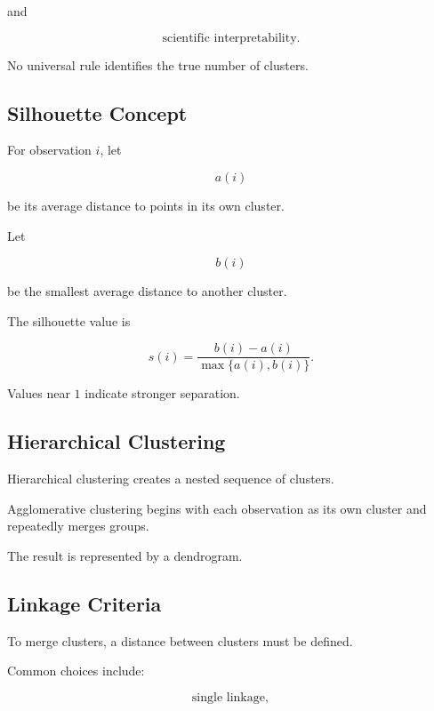 and

\[
\boxed{
\text{scientific interpretability}.
}
\]

No universal rule identifies the true number of clusters.

\subsection{Silhouette Concept}
\label{subsec:silhouette}

For observation \(i\), let

\[
a(i)
\]

be its average distance to points in its own cluster.

Let

\[
b(i)
\]

be the smallest average distance to another cluster.

The silhouette value is

\[
\boxed{
s(i)
=
\frac{
b(i)-a(i)
}{
\max\{a(i),b(i)\}
}.
}
\]

Values near \(1\) indicate stronger separation.

\subsection{Hierarchical Clustering}
\label{subsec:hierarchical-clustering}

Hierarchical clustering creates a nested sequence of clusters.

Agglomerative clustering begins with each observation as its own cluster
and repeatedly merges groups.

The result is represented by a dendrogram.

\subsection{Linkage Criteria}
\label{subsec:linkage-criteria}

To merge clusters, a distance between clusters must be defined.

Common choices include:

\[
\boxed{
\text{single linkage},
}
\]

